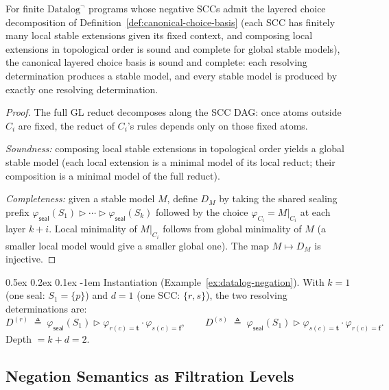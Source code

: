 \documentclass[acmsmall,review,anonymous]{acmart}
\makeatletter
\renewcommand{\paragraph}{\@startsection{paragraph}{4}{\z@}%
  {0.5ex \@plus 0.2ex \@minus 0.1ex}%
  {-1em}%
  {\normalfont\normalsize\bfseries}}
\newcommand{\seal}{\mathsf{seal}}
\newcommand{\seq}{\mathbin{\triangleright}}
\theoremstyle{remark}
\numberwithin{definition}{section}
\numberwithin{theorem}{section}
\numberwithin{lemma}{section}
\numberwithin{corollary}{section}
\numberwithin{remark}{section}
\numberwithin{example}{section}
\numberwithin{observation}{section}
\numberwithin{assumption}{section}
\makeatother
\begin{document}
\begin{proposition}
  \label{prop:canonical-basis-sc}
  For finite $\mbox{Datalog}^\neg$ programs whose negative SCCs admit
  the layered choice decomposition of
  Definition~\ref{def:canonical-choice-basis} (each SCC has finitely
  many local stable extensions given its fixed context, and composing
  local extensions in topological order is sound and complete for
  global stable models), the canonical layered choice basis is sound
  and complete: each resolving determination produces a stable model,
  and every stable model is produced by exactly one resolving
  determination.
\end{proposition}
\begin{proof}
  The full GL reduct decomposes along the SCC DAG: once atoms outside
  $C_i$ are fixed, the reduct of $C_i$'s rules depends only on those
  fixed atoms.

  \emph{Soundness:} composing local stable extensions in topological
  order yields a global stable model (each local extension is a minimal
  model of its local reduct; their composition is a minimal model of
  the full reduct).

  \emph{Completeness:} given a stable model $M$, define $D_M$ by
  taking the shared sealing prefix
  $\varphi_{\seal}(S_1) \seq \cdots \seq \varphi_{\seal}(S_k)$
  followed by the choice $\varphi_{C_i} = M|_{C_i}$ at each layer
  $k{+}i$.
  Local minimality of $M|_{C_i}$ follows from global minimality of $M$
  (a smaller local model would give a smaller global one).
  The map $M \mapsto D_M$ is injective.
\end{proof}

\paragraph{Instantiation (Example~\ref{ex:datalog-negation}).}
With $k = 1$ (one seal: $S_1 = \{p\}$) and $d = 1$ (one SCC:
$\{r, s\}$), the two resolving determinations are:
\[
  D^{(r)}
  \;\triangleq\;
  \varphi_{\seal}(S_1)
  \seq
  \varphi_{r(c)=\mathbf{t}} \cdot \varphi_{s(c)=\mathbf{f}},
  \qquad
  D^{(s)}
  \;\triangleq\;
  \varphi_{\seal}(S_1)
  \seq
  \varphi_{s(c)=\mathbf{t}} \cdot \varphi_{r(c)=\mathbf{f}}.
\]
Depth $= k{+}d = 2$.

\subsection{Negation Semantics as Filtration Levels}
\end{document}
